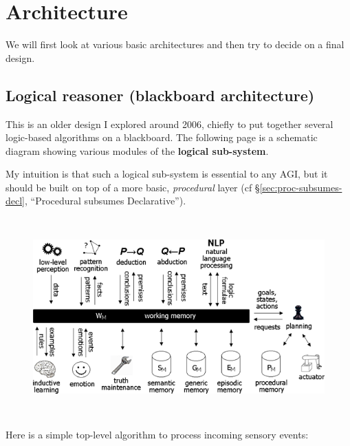 \chapter{Architecture}
\minitoc

We will first look at various basic architectures and then try to decide on a final design.

\section{Logical reasoner (blackboard architecture)}
\label{sec:blackboard-architecture}

This is an older design I explored around 2006, chiefly to put together several logic-based algorithms on a blackboard.  The following page is a schematic diagram showing various modules of the \textbf{logical sub-system}.

My intuition is that such a logical sub-system is essential to any AGI, but it should be built on top of a more basic, \textit{procedural} layer (cf \S\ref{sec:proc-subsumes-decl}, ``Procedural subsumes Declarative'').

\begin{figure}[H]
\centering
\includegraphics[width=5.65625in,height=2.9895833in,bb=0 0 543 287]{blackboard-architecture.png}
\end{figure}

Here is a simple top-level algorithm to process incoming sensory events:

